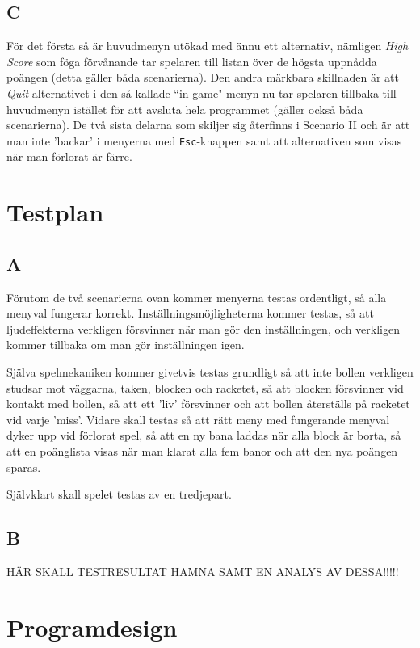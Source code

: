 \documentclass[11pt,a4paper]{article}
\begin{document}
\subsection{C}
För det första så är huvudmenyn utökad med ännu ett alternativ, nämligen \emph{High Score} som föga förvånande tar spelaren till listan över de högsta uppnådda poängen (detta gäller båda scenarierna). Den andra märkbara skillnaden är att \emph{Quit}-alternativet i den så kallade ``in game"-menyn nu tar spelaren tillbaka till huvudmenyn istället för att avsluta hela programmet (gäller också båda scenarierna). De två sista delarna som skiljer sig återfinns i Scenario II och är att man inte 'backar' i menyerna med \texttt{Esc}-knappen samt att alternativen som visas när man förlorat är färre.

\section{Testplan}

\subsection{A}
Förutom de två scenarierna ovan kommer menyerna testas ordentligt, så alla menyval fungerar korrekt. Inställningsmöjligheterna kommer testas, så att ljudeffekterna verkligen försvinner när man gör den inställningen, och verkligen kommer tillbaka om man gör inställningen igen.

Själva spelmekaniken kommer givetvis testas grundligt så att inte bollen verkligen studsar mot väggarna, taken, blocken och racketet, så att blocken försvinner vid kontakt med bollen, så att ett 'liv' försvinner och att bollen återställs på racketet vid varje 'miss'. Vidare skall testas så att rätt meny med fungerande menyval dyker upp vid förlorat spel, så att en ny bana laddas när alla block är borta, så att en poänglista visas när man klarat alla fem banor och att den nya poängen sparas.

Självklart skall spelet testas av en tredjepart.

\subsection{B}
HÄR SKALL TESTRESULTAT HAMNA SAMT EN ANALYS AV DESSA!!!!!

\section{Programdesign}
\end{document}
